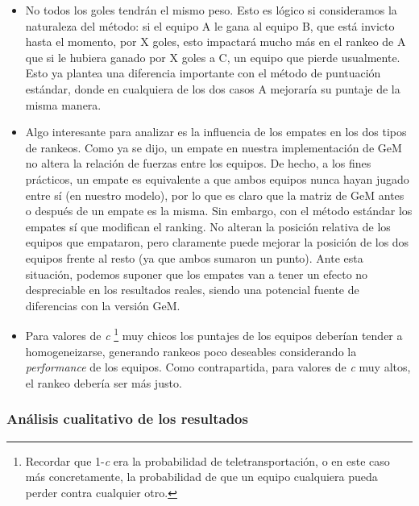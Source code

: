 \begin{itemize}
	\item No todos los goles tendrán el mismo peso. Esto es lógico si consideramos la naturaleza del método: si el equipo A le gana al equipo B, que está invicto hasta el momento, por X goles, esto impactará mucho más en el rankeo de A que si le hubiera ganado por X goles a C, un equipo que pierde usualmente. Esto ya plantea una diferencia importante con el método de puntuación estándar, donde en cualquiera de los dos casos A mejoraría su puntaje de la misma manera.

	\item Algo interesante para analizar es la influencia de los empates en los dos tipos de rankeos. Como ya se dijo, un empate en nuestra implementación de GeM no altera la relación de fuerzas entre los equipos. De hecho, a los fines prácticos, un empate es equivalente a que ambos equipos nunca hayan jugado entre sí (en nuestro modelo), por lo que es claro que la matriz de GeM antes o después de un empate es la misma. Sin embargo, con el método estándar los empates sí que modifican el ranking. No alteran la posición relativa de los equipos que empataron, pero claramente puede mejorar la posición de los dos equipos frente al resto (ya que ambos sumaron un punto). Ante esta situación, podemos suponer que los empates van a tener un efecto no despreciable en los resultados reales, siendo una potencial fuente de diferencias con la versión GeM.

	\item Para valores de \emph{c} \footnote{Recordar que 1-\emph{c} era la probabilidad de teletransportación, o en este caso más concretamente, la probabilidad de que un equipo cualquiera pueda perder contra cualquier otro.} muy chicos los puntajes de los equipos deberían tender a homogeneizarse, generando rankeos poco deseables considerando la \emph{performance} de los equipos. Como contrapartida, para valores de \emph{c} muy altos, el rankeo debería ser más justo.
\end{itemize}


\subsubsection{Análisis cualitativo de los resultados}

